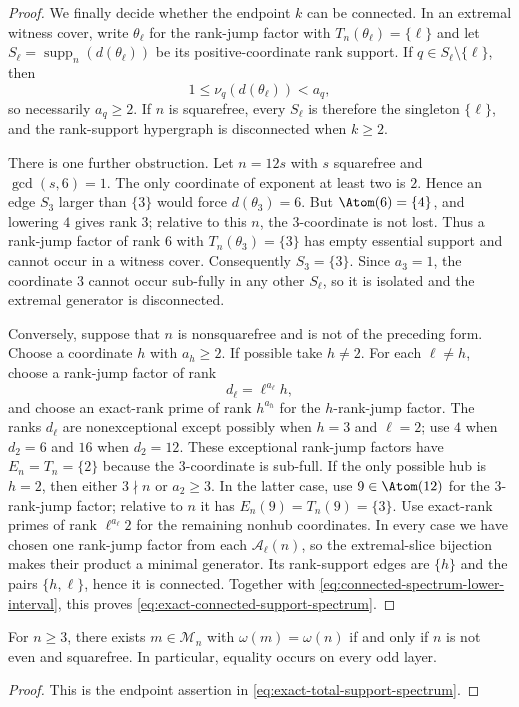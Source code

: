 \begin{proof}
We finally decide whether the endpoint $k$ can be connected. In an extremal
witness cover, write $\theta_\ell$ for the rank-jump factor with
$T_n(\theta_\ell)=\{\ell\}$ and let
$S_\ell=\operatorname{supp}_n(d(\theta_\ell))$ be its positive-coordinate
rank support. If $q\in S_\ell\setminus\{\ell\}$, then
\[
 1\le\nu_q(d(\theta_\ell))<a_q,
\]
so necessarily $a_q\ge2$. If $n$ is squarefree, every $S_\ell$ is therefore
the singleton $\{\ell\}$, and the rank-support hypergraph is disconnected
when $k\ge2$.

There is one further obstruction. Let $n=12s$ with $s$ squarefree and
$\gcd(s,6)=1$. The only coordinate of exponent at least two is $2$. Hence an
edge $S_3$ larger than $\{3\}$ would force $d(\theta_3)=6$. But
$\Atom(6)=\{4\}$, and lowering $4$ gives rank $3$; relative to this $n$, the
$3$-coordinate is not lost. Thus a rank-jump factor of rank $6$ with
$T_n(\theta_3)=\{3\}$ has empty essential support and cannot occur in a
witness cover. Consequently $S_3=\{3\}$. Since $a_3=1$, the coordinate $3$
cannot occur sub-fully in any other $S_\ell$, so it is isolated and the
extremal generator is disconnected.

Conversely, suppose that $n$ is nonsquarefree and is not of the preceding
form. Choose a coordinate $h$ with $a_h\ge2$. If possible take $h\ne2$. For
each $\ell\ne h$, choose a rank-jump factor of rank
\[
 d_\ell=\ell^{a_\ell}h,
\]
and choose an exact-rank prime of rank $h^{a_h}$ for the $h$-rank-jump factor. The ranks
$d_\ell$ are nonexceptional except possibly when $h=3$ and $\ell=2$; use
$4$ when $d_2=6$ and $16$ when $d_2=12$. These exceptional rank-jump factors have
$E_n=T_n=\{2\}$ because the $3$-coordinate is sub-full. If the only possible
hub is $h=2$, then either $3\nmid n$ or $a_2\ge3$. In the latter case, use
$9\in\Atom(12)$ for the $3$-rank-jump factor; relative to $n$ it has
$E_n(9)=T_n(9)=\{3\}$. Use exact-rank primes of rank
$\ell^{a_\ell}2$ for the remaining nonhub coordinates. In every case we have
chosen one rank-jump factor from each $\mathcal A_\ell(n)$, so the extremal-slice
bijection makes their product a minimal generator. Its rank-support edges are
$\{h\}$ and the pairs $\{h,\ell\}$, hence it is connected. Together with
\eqref{eq:connected-spectrum-lower-interval}, this proves
\eqref{eq:exact-connected-support-spectrum}.
\end{proof}

\begin{corollary}\label{cor:support-bound-sharp}
For $n\ge3$, there exists $m\in\mathcal M_n$ with
$\omega(m)=\omega(n)$ if and only if $n$ is not even and squarefree. In
particular, equality occurs on every odd layer.
\end{corollary}

\begin{proof}
This is the endpoint assertion in \eqref{eq:exact-total-support-spectrum}.
\end{proof}
